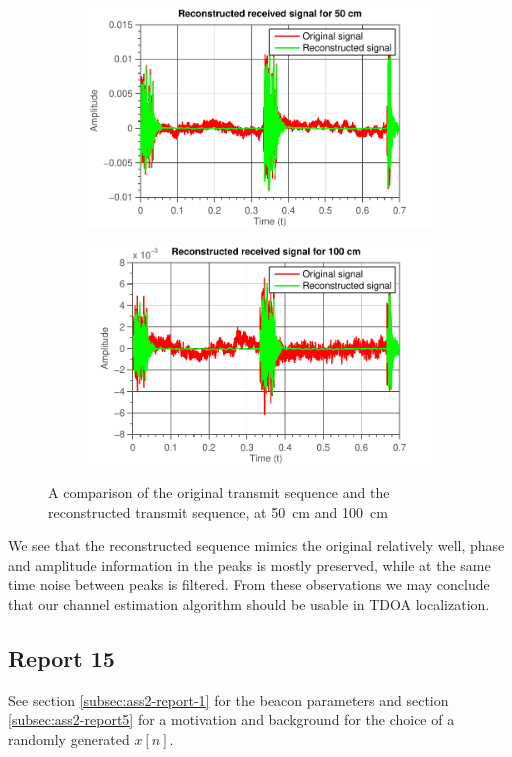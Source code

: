 \documentclass[11pt,titlepage]{report}
\begin{document}
\begin{figure}[H]
	\centering
	\begin{subfigure}{0.49\textwidth}
		\includegraphics[width=\textwidth]{../../deliverable-7-resources/figures/ass-1/report-14-15/ass-1-report-14-50cm-reconstruction.pdf}
	\end{subfigure}
	\begin{subfigure}{0.49\textwidth}
		\includegraphics[width=\textwidth]{../../deliverable-7-resources/figures/ass-1/report-14-15/ass-1-report-14-100cm-reconstruction.pdf}
	\end{subfigure}
	\caption{A comparison of the original transmit sequence and the reconstructed transmit sequence, at \SI{50}{cm} and \SI{100}{cm}}
	\label{fig:rep14-comparison}
\end{figure}

We see that the reconstructed sequence mimics the original relatively well, phase and amplitude information in the peaks is mostly preserved, while at the same time noise between peaks is filtered. From these observations we may conclude that our channel estimation algorithm should be usable in TDOA localization.

\subsection{Report 15}
See section \ref{subsec:ass2-report-1} for the beacon parameters and section \ref{subsec:ass2-report5} for a motivation and background for the choice of a randomly generated $x[n]$.
\end{document}
